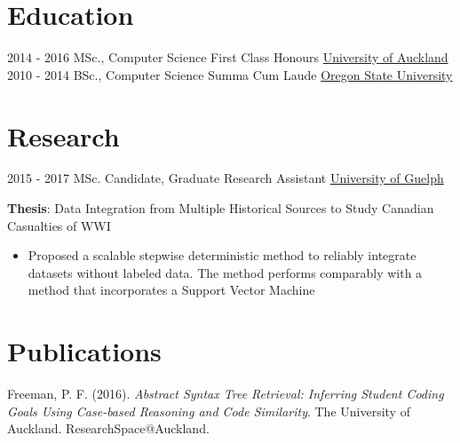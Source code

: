 \documentclass[a4paper]{twentysecondcv} %
\begin{document}
\makeprofile %

\section{Education}

\begin{twenty} %
    \twentyitem
        {2014 - 2016}
        {}
        {MSc., Computer Science \textnormal{First Class Honours}}
        {\href{http://www.uoguelph.ca/}{University of Auckland}}
        {}
        {}
    \twentyitem
        {2010 - 2014}
    {}
        {BSc., Computer Science \textnormal{Summa Cum Laude}}
        {\href{http://www.unipune.ac.in/}{Oregon State University}}
        {}
        {}
\end{twenty}

\section{Research}
\begin{twenty}
    \twentyitem
        {2015 - 2017}
        {}
        {MSc. Candidate, Graduate Research Assistant}
        {\href{http://www.uoguelph.ca/}{University of Guelph}}
        {}
        {\textbf{Thesis}: Data Integration from Multiple Historical Sources to
                          Study Canadian Casualties of WWI
        {\begin{itemize}
        \item Proposed a scalable stepwise deterministic method to reliably
              integrate datasets without labeled data. The method performs
              comparably with a method that incorporates a Support Vector
              Machine
        \end{itemize}}}
\end{twenty}

\section{Publications}
Freeman, P. F. (2016). \emph{Abstract Syntax Tree Retrieval: Inferring Student
Coding Goals Using Case-based Reasoning and Code Similarity}. The University of
Auckland. ResearchSpace@Auckland.
\end{document}

